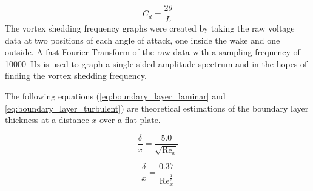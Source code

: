 \begin{equation} \label{eq:C_d}
    C_d = \frac{2\theta}{L}
\end{equation}
The vortex shedding frequency graphs were created by taking the raw voltage data at two positions of each angle of attack, one inside the wake and one outside. A fast Fourier Transform of the raw data with a sampling frequency of \qty{10000}{\hertz} is used to graph a single-sided amplitude spectrum and in the hopes of finding the vortex shedding frequency. 

The following equations (\autoref{eq:boundary_layer_laminar} and \autoref{eq:boundary_layer_turbulent}) are theoretical estimations of the boundary layer thickness at a distance $x$ over a flat plate. 

\begin{equation} \label{eq:boundary_layer_laminar}
    \frac{\delta}{x} = \frac{5.0}{\sqrt{\text{Re}_x}}
\end{equation}

\begin{equation} \label{eq:boundary_layer_turbulent}
    \frac{\delta}{x} = \frac{0.37}{\text{Re}_x^\frac{1}{5}}
\end{equation}

